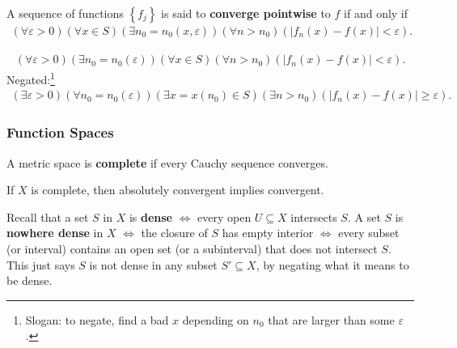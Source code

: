 \begin{definition}

A sequence of functions \(\left\{{ f_j }\right\}\) is said to
\textbf{converge pointwise} to \(f\) if and only if
\begin{align*}  
(\forall \varepsilon>0)(\forall x \in S)\left(\exists n_{0} = n_0(x, {\varepsilon}) \right)\left(\forall n>n_{0}\right)\left(\left|f_{n}(x)-f(x)\right|<\varepsilon\right)
.\end{align*}

\end{definition}

\begin{definition}

\begin{align*}
(\forall \varepsilon>0)\left(\exists n_{0} = n_0({\varepsilon}) \right)(\forall x \in S)\left(\forall n>n_{0}\right)\left(\left|f_{n}(x)-f(x)\right|<\varepsilon\right)
.\end{align*}
Negated:\footnote{Slogan: to negate, find a bad \(x\) depending on
  \(n_0\) that are larger than some \({\varepsilon}\).}
\begin{align*}  
(\exists \varepsilon>0)\left(\forall n_{0} = n_0 ({\varepsilon}) \right)(\exists x = x(n_0) \in S)\left(\exists n>n_{0}\right)\left(\left|f_{n}(x)-f(x)\right| \geq \varepsilon\right)
.\end{align*}

\end{definition}

\hypertarget{function-spaces}{%
\subsubsection{Function Spaces}\label{function-spaces}}

\begin{definition}[Completeness]

A metric space is \textbf{complete} if every Cauchy sequence converges.

\end{definition}

\begin{fact}

If \(X\) is complete, then absolutely convergent implies convergent.

\end{fact}

\begin{definition}

Recall that a set \(S\) in \(X\) is \textbf{dense} \(\iff\) every open
\(U\subseteq X\) intersects \(S\). A set \(S\) is \textbf{nowhere dense}
in \(X\) \(\iff\) the closure of \(S\) has empty interior \(\iff\) every
subset (or interval) contains an open set (or a subinterval) that does
not intersect \(S\). This just says \(S\) is not dense in any subset
\(S' \subseteq X\), by negating what it means to be dense.

\end{definition}

